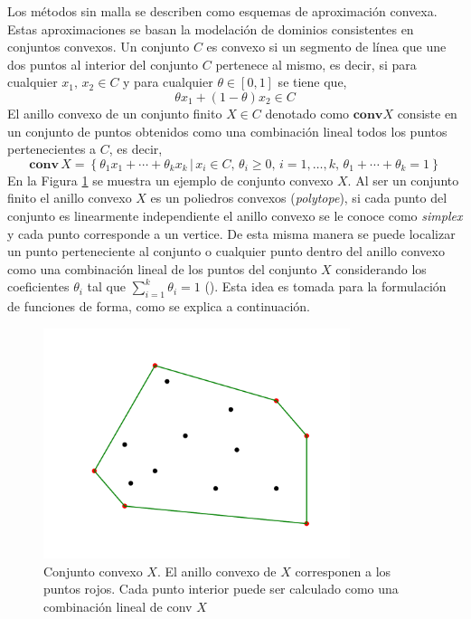 Los métodos sin malla se describen como esquemas de aproximación convexa. Estas aproximaciones se basan la modelación de dominios consistentes en conjuntos convexos.
Un conjunto $C$ es convexo si un segmento de línea que une dos puntos al interior del conjunto $C$ pertenece al mismo, es decir, si para cualquier $x_1, \, x_2 \in C$ y para cualquier $\theta \in [0,1]$ se tiene que,
\begin{equation}
\theta x_1 + (1-\theta) x_2 \in C
\end{equation}
El anillo convexo de un conjunto finito $X \in C$ denotado como $\bm{\mbox{conv}} X$ consiste en un conjunto de puntos obtenidos como una combinación lineal todos los puntos pertenecientes a $C$, es decir,
\begin{equation} \label{eq:convex_hull}
\bm{ \mbox{conv} } \, X = \left\{ \theta_1 x_1 + \cdots + \theta_k x_k \, \Big| \, x_i \in C , \, \theta_i \geq 0, \, i=1, \ldots, k, \, \theta_1 + \cdots + \theta_k = 1  \right\}
\end{equation}
En la Figura \ref{fig:convex_example} se muestra un ejemplo de conjunto convexo $X$. Al ser un conjunto finito el anillo convexo  $X$ es un poliedros convexos (\textit{polytope}), si cada punto del conjunto es linearmente independiente el anillo convexo se le conoce como \textit{simplex} y cada punto corresponde a un vertice. De esta misma manera se puede localizar un punto perteneciente al conjunto o cualquier punto dentro del anillo convexo como una combinación lineal de los puntos del conjunto $X$ considerando los coeficientes $\theta_i$ tal que $\sum_{i=1}^k \theta_i = 1$ (\cite{opt-convx}). Esta idea es tomada para la formulación de funciones de forma, como se explica a continuación.
\begin{figure}
    \centering
    \includegraphics[width=0.8\textwidth]{convex_example.pdf}
    \caption{Conjunto convexo $X$. El anillo convexo de $X$ corresponen a los puntos rojos. Cada punto interior puede ser calculado como una combinación lineal de conv $X$ }
    \label{fig:convex_example}
\end{figure}


